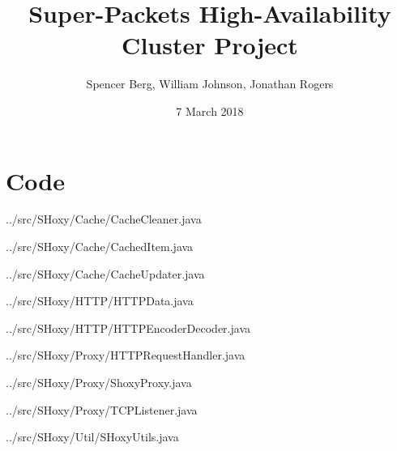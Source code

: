 \documentclass[11pt]{article}
\title{Super-Packets High-Availability Cluster Project}
\author{Spencer Berg, William Johnson, Jonathan Rogers}
\date{7 March 2018}
\begin{document}
\maketitle

\thispagestyle{empty}

\begin{doublespace}



\end{doublespace}
\section{Code}

\begin{tiny}

\begin{lstinputlisting}[language=Java]{../src/SHoxy/Cache/CacheCleaner.java}
\end{lstinputlisting}
\begin{lstinputlisting}[language=Java]{../src/SHoxy/Cache/CachedItem.java}
\end{lstinputlisting}
\begin{lstinputlisting}[language=Java]{../src/SHoxy/Cache/CacheUpdater.java}
\end{lstinputlisting}
\begin{lstinputlisting}[language=Java]{../src/SHoxy/HTTP/HTTPData.java}
\end{lstinputlisting}
\begin{lstinputlisting}[language=Java]{../src/SHoxy/HTTP/HTTPEncoderDecoder.java}
\end{lstinputlisting}
\begin{lstinputlisting}[language=Java]{../src/SHoxy/Proxy/HTTPRequestHandler.java}
\end{lstinputlisting}
\begin{lstinputlisting}[language=Java]{../src/SHoxy/Proxy/ShoxyProxy.java}
\end{lstinputlisting}
\begin{lstinputlisting}[language=Java]{../src/SHoxy/Proxy/TCPListener.java}
\end{lstinputlisting}
\begin{lstinputlisting}[language=Java]{../src/SHoxy/Util/SHoxyUtils.java}
\end{lstinputlisting}

\end{tiny}
\end{document}
